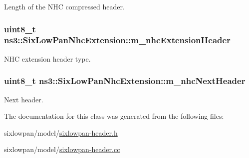Length of the N\+HC compressed header. 

\subsubsection[{\texorpdfstring{m\+\_\+nhc\+Extension\+Header}{m_nhcExtensionHeader}}]{\setlength{\rightskip}{0pt plus 5cm}uint8\+\_\+t ns3\+::\+Six\+Low\+Pan\+Nhc\+Extension\+::m\+\_\+nhc\+Extension\+Header\hspace{0.3cm}{\ttfamily [private]}}\hypertarget{classns3_1_1SixLowPanNhcExtension_a4fe43caeba3a84f5c51ebe9d0948f947}{}\label{classns3_1_1SixLowPanNhcExtension_a4fe43caeba3a84f5c51ebe9d0948f947}


N\+HC extension header type. 

\subsubsection[{\texorpdfstring{m\+\_\+nhc\+Next\+Header}{m_nhcNextHeader}}]{\setlength{\rightskip}{0pt plus 5cm}uint8\+\_\+t ns3\+::\+Six\+Low\+Pan\+Nhc\+Extension\+::m\+\_\+nhc\+Next\+Header\hspace{0.3cm}{\ttfamily [private]}}\hypertarget{classns3_1_1SixLowPanNhcExtension_a00b5e90b02f8219348b3f262af793817}{}\label{classns3_1_1SixLowPanNhcExtension_a00b5e90b02f8219348b3f262af793817}


Next header. 



The documentation for this class was generated from the following files\+:\begin{DoxyCompactItemize}
\item 
sixlowpan/model/\hyperlink{sixlowpan-header_8h}{sixlowpan-\/header.\+h}\item 
sixlowpan/model/\hyperlink{sixlowpan-header_8cc}{sixlowpan-\/header.\+cc}\end{DoxyCompactItemize}
